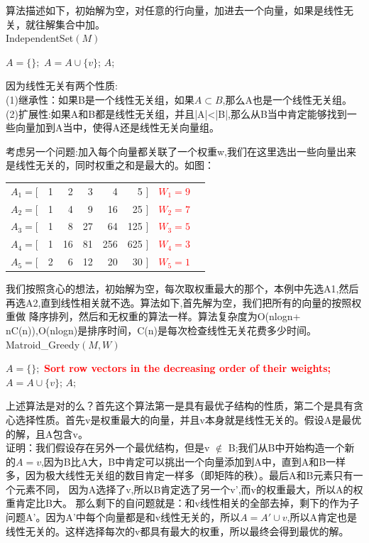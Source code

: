 算法描述如下，初始解为空，对任意的行向量，加进去一个向量，如果是线性无关，就往解集合中加。\\
{\sc IndependentSet}$( M )$
\begin{algorithmic}[1]
\STATE $A=\{ \};$
\STATE $A=A\cup\{v\}$;
\ENDIF
\ENDFOR
\RETURN $A$;
\end{algorithmic}
因为线性无关有两个性质:\\
(1)继承性：如果B是一个线性无关组，如果$A　\subset B$,那么A也是一个线性无关组。\\
(2)扩展性:如果A和B都是线性无关组，并且|A|<|B|,那么从B当中肯定能够找到一些向量加到A当中，使得A还是线性无关向量组。

考虑另一个问题:加入每个向量都关联了一个权重w,我们在这里选出一些向量出来是线性无关的，同时权重之和是最大的。如图：
\begin{table}[!htbp]{
\begin{tabular}{lrrrrrrl}
$A_{1}=[$& 1 & 2 & 3 & 4 & 5 $]$&\textcolor{red}{$W_{1}=9$} \\ 
$A_{2}=[$& 1 & 4 & 9 & 16 & 25 $]$&\textcolor{red}{$W_{2}=7$} \\ 
$A_{3}=[$& 1 & 8 & 27 & 64 & 125 $]$&\textcolor{red}{$W_{3}=5$}\\ 
$A_{4}=[$& 1 & 16 & 81 & 256 & 625 $]$&\textcolor{red}{$W_{4}=3$}\\ 
$A_{5}=[$& 2 & 6 & 12 & 20 & 30 $]$&\textcolor{red}{$W_{5}=1$}\\ 
\end{tabular}}{}
\end{table}
我们按照贪心的想法，初始解为空，每次取权重最大的那个，本例中先选A1,然后再选A2,直到线性相关就不选。算法如下,首先解为空，我们把所有的向量的按照权重做
降序排列，然后和无权重的算法一样。算法复杂度为O(nlogn+ nC(n)),O(nlogn)是排序时间，C(n)是每次检查线性无关花费多少时间。\\
{\sc Matroid\_Greedy}$( M, W )$
\begin{algorithmic}[1]
\STATE $A=\{ \};$
\STATE \textcolor{red}{\bf Sort row vectors in the decreasing order of their weights;}
\STATE $A=A\cup\{v\}$;
\ENDIF
\ENDFOR
\RETURN $A$;
\end{algorithmic}

上述算法是对的么？首先这个算法第一是具有最优子结构的性质，第二个是具有贪心选择性质。首先v是权重最大的向量，并且v本身就是线性无关的。假设A是最优的解，且A包含v。\\
证明：我们假设存在另外一个最优结构，但是v $\notin$ B;我们从B中开始构造一个新的$A={v}$,因为B比A大，B中肯定可以挑出一个向量添加到A中，直到A和B一样多，因为极大线性无关组的数目肯定一样多（即矩阵的秩）。最后A和B元素只有一个元素不同，
因为A选择了v,所以B肯定选了另一个v',而v的权重最大，所以A的权重肯定比B大。
那么剩下的自问题就是：和v线性相关的全部去掉，剩下的作为子问题A'。因为A'中每个向量都是和v线性无关的，所以$A=A'\cup{v}$,所以A肯定也是线性无关的。这样选择每次的v都具有最大的权重，所以最终会得到最优的解。

